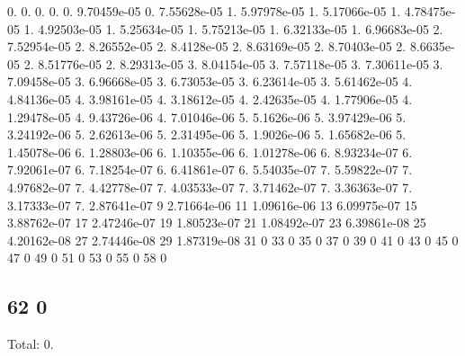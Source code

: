 0. 0. 0. 0. 0. 9.\+70459e-\/05 0. 7.\+55628e-\/05 1. 5.\+97978e-\/05 1. 5.\+17066e-\/05 1. 4.\+78475e-\/05 1. 4.\+92503e-\/05 1. 5.\+25634e-\/05 1. 5.\+75213e-\/05 1. 6.\+32133e-\/05 1. 6.\+96683e-\/05 2. 7.\+52954e-\/05 2. 8.\+26552e-\/05 2. 8.\+4128e-\/05 2. 8.\+63169e-\/05 2. 8.\+70403e-\/05 2. 8.\+6635e-\/05 2. 8.\+51776e-\/05 2. 8.\+29313e-\/05 3. 8.\+04154e-\/05 3. 7.\+57118e-\/05 3. 7.\+30611e-\/05 3. 7.\+09458e-\/05 3. 6.\+96668e-\/05 3. 6.\+73053e-\/05 3. 6.\+23614e-\/05 3. 5.\+61462e-\/05 4. 4.\+84136e-\/05 4. 3.\+98161e-\/05 4. 3.\+18612e-\/05 4. 2.\+42635e-\/05 4. 1.\+77906e-\/05 4. 1.\+29478e-\/05 4. 9.\+43726e-\/06 4. 7.\+01046e-\/06 5. 5.\+1626e-\/06 5. 3.\+97429e-\/06 5. 3.\+24192e-\/06 5. 2.\+62613e-\/06 5. 2.\+31495e-\/06 5. 1.\+9026e-\/06 5. 1.\+65682e-\/06 5. 1.\+45078e-\/06 6. 1.\+28803e-\/06 6. 1.\+10355e-\/06 6. 1.\+01278e-\/06 6. 8.\+93234e-\/07 6. 7.\+92061e-\/07 6. 7.\+18254e-\/07 6. 6.\+41861e-\/07 6. 5.\+54035e-\/07 7. 5.\+59822e-\/07 7. 4.\+97682e-\/07 7. 4.\+42778e-\/07 7. 4.\+03533e-\/07 7. 3.\+71462e-\/07 7. 3.\+36363e-\/07 7. 3.\+17333e-\/07 7. 2.\+87641e-\/07 9 2.\+71664e-\/06 11 1.\+09616e-\/06 13 6.\+09975e-\/07 15 3.\+88762e-\/07 17 2.\+47246e-\/07 19 1.\+80523e-\/07 21 1.\+08492e-\/07 23 6.\+39861e-\/08 25 4.\+20162e-\/08 27 2.\+74446e-\/08 29 1.\+87319e-\/08 31 0 33 0 35 0 37 0 39 0 41 0 43 0 45 0 47 0 49 0 51 0 53 0 55 0 58 0 \subsection*{62 0 }

Total\+: 0. 